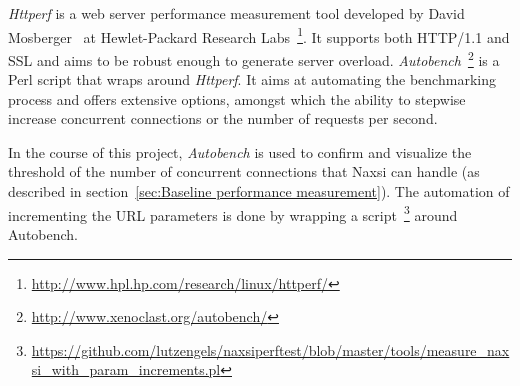 \emph{Httperf} is a web server performance measurement tool developed by David Mosberger~\cite{mosberger1998httperf} at Hewlet-Packard Research Labs~\footnote{\url{http://www.hpl.hp.com/research/linux/httperf/}}. It supports both HTTP/1.1 and SSL and aims to be robust enough to generate server overload. \emph{Autobench}~\footnote{\url{http://www.xenoclast.org/autobench/}} is a Perl script that wraps around \emph{Httperf}. It aims at automating the benchmarking process and offers extensive options, amongst which the ability to stepwise increase concurrent connections or the number of requests per second. 

In the course of this project, \emph{Autobench} is used to confirm and visualize the threshold of the number of concurrent connections that Naxsi can handle (as described in section~\ref{sec:Baseline performance measurement}). The automation of incrementing the URL parameters is done by wrapping a script~\footnote{\url{https://github.com/lutzengels/naxsiperftest/blob/master/tools/measure_naxsi_with_param_increments.pl}}  around Autobench.
